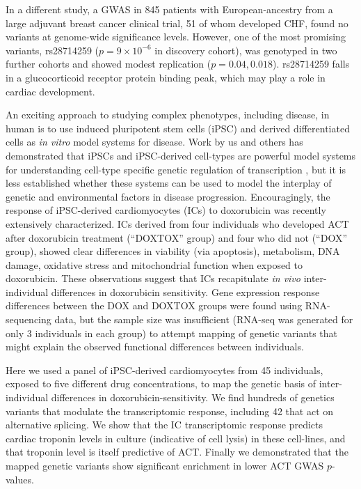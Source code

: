 \documentclass{article}
\begin{document}
In a different study, a GWAS in 845 patients with European-ancestry from a large adjuvant breast cancer clinical trial, 51 of whom developed CHF, found no variants at genome-wide significance levels\cite{Schneider2016}. However, one of the most promising variants, rs28714259 ($p=9 \times 10^{-6}$ in discovery cohort), was genotyped in two further cohorts and showed modest replication ($p=0.04, 0.018$). rs28714259 falls in a glucocorticoid receptor protein binding peak, which may play a role in cardiac development. 

An exciting approach to studying complex phenotypes, including disease, in human is to use induced pluripotent stem cells (iPSC) and derived differentiated cells as \emph{in vitro} model systems for disease. Work by us and others has demonstrated that iPSCs and iPSC-derived cell-types are powerful model systems for understanding cell-type specific genetic regulation of transcription \citep{Thomas2015,Burrows2016,Banovich091660,Kilpinen2017,Alasoo102392}, but it is less established whether these systems can be used to model the interplay of genetic and environmental factors in disease progression. Encouragingly, the response of iPSC-derived cardiomyocytes (ICs) to doxorubicin was recently extensively characterized\cite{Burridge2016}. ICs derived from four individuals who developed ACT after doxorubicin treatment (``DOXTOX'' group) and four who did not (``DOX'' group), showed clear differences in viability (via apoptosis), metabolism, DNA damage, oxidative stress and mitochondrial function when exposed to doxorubicin. These observations suggest that ICs recapitulate \emph{in vivo} inter-individual differences in doxorubicin sensitivity. Gene expression response differences between the DOX and DOXTOX groups were found using RNA-sequencing data, but the sample size was insufficient (RNA-seq was generated for only 3 individuals in each group) to attempt mapping of genetic variants that might explain the observed functional differences between individuals. 

Here we used a panel of iPSC-derived cardiomyocytes from 45 individuals, exposed to five different drug concentrations, to map the genetic basis of inter-individual differences in doxorubicin-sensitivity. We find hundreds of genetics variants that modulate the  transcriptomic response, including 42 that act on alternative splicing. We show that the IC transcriptomic response predicts cardiac troponin levels in culture (indicative of cell lysis) in these cell-lines, and that troponin level is itself predictive of ACT. Finally we demonstrated that the mapped genetic variants show significant enrichment in lower ACT GWAS $p$-values. 
\end{document}
